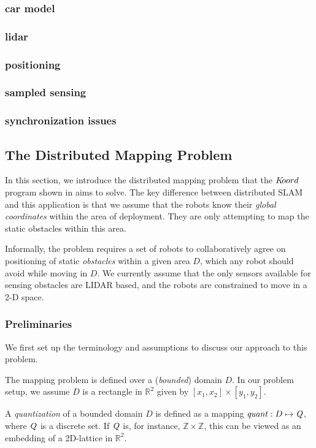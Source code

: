 \subsubsection{car model}
\subsubsection{lidar}
\subsubsection{positioning}
\subsubsection{sampled sensing}
\subsubsection{synchronization issues}
 
\subsection{The Distributed Mapping Problem}
In this section, we introduce the distributed mapping problem that the $K\kern-2pt oord$ program shown in  aims to solve. The key difference between distributed SLAM and this application is that we assume that the robots know their \emph{global coordinates} within the area of deployment. They are only attempting to map the static obstacles within this area.

Informally, the problem requires a set of robots to collaboratively agree on positioning of static \emph{obstacles} within a given area $D$, which any robot should avoid while moving in $D$. We currently assume that the only sensors available for sensing obstacles are LIDAR based, and the robots are constrained to move in a 2-D space.


\subsubsection{Preliminaries}
\label{sec:prelims}
We first set up the terminology and assumptions to discuss our approach to this problem. 

The mapping problem is defined over a (\emph{bounded}) domain $D$. In our problem setup, we assume $D$ is a rectangle in $\mathbb{R}^2$ given by $[x_1,x_2]\times [y_1,y_2]$.

\begin{definition}
A \emph{quantization} of a bounded domain $D$ is defined as a mapping $\mathit{quant}:D \mapsto \mathit{Q}$, where $\mathit{Q}$ is a discrete set. If $\mathit{Q}$ is, for instance, $\mathbb{Z}\times \mathbb{Z}$, this can be viewed as an embedding of a 2D-lattice in $\mathbb{R}^2$. 
\end{definition}

